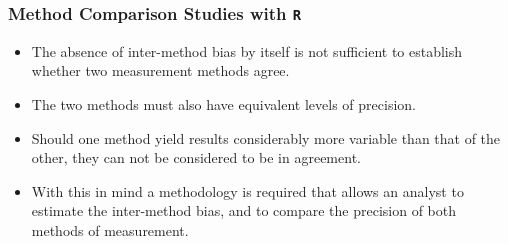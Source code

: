 \documentclass[compress]{beamer}        %
\makeatletter
\newcommand{\tcb}{\textcolor{beamer@blendedblue}}
\makeatother
\begin{document}
%
%
%



\begin{frame}
\frametitle{Method Comparison Studies with \texttt{R}}
\large
\begin{itemize}
\item 
The absence of inter-method bias by itself is not sufficient to
establish whether two measurement methods agree. 
\item The two
methods must also have equivalent levels of precision. 
\item Should one
method yield results considerably more variable than that of the
other, they can not be considered to be in agreement. 
\item With this in
mind a methodology is required that allows an analyst to estimate
the inter-method bias, and to compare the precision of both
methods of measurement.
\end{itemize}
\end{frame}


\end{document}
